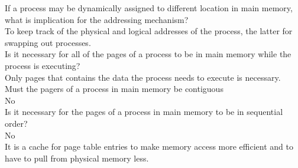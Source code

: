\documentclass[12pt,largemargins]{homework}
\begin{document}
If a process may be dynamically assigned to different location in main memory, what is implication for the addressing mechanism?\\
To keep track of the physical and logical addresses of the process, the latter for swapping out processes.\\
Is it necessary for all of the pages of a process to be in main memory while the process is executing?\\
Only pages that contains the data the process needs to execute is necessary.\\
Must the pagers of a process in main memory be contiguous\\
No\\
Is it necessary for the pages of a process in main memory to be in sequential order?\\
No\\
It is a cache for page table entries to make memory access more efficient and to have to pull from physical memory less.
\end{document}
